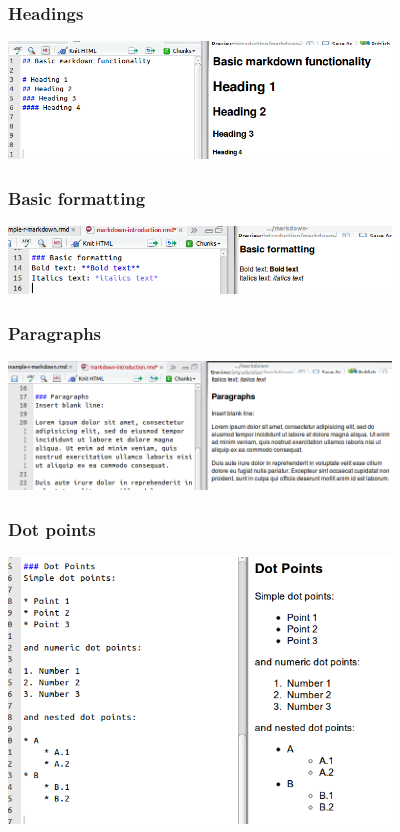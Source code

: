 \begin{frame}\frametitle{Headings}

\includegraphics[width=4in]{figures/headings.png}

\end{frame}

\begin{frame}\frametitle{Basic formatting}

\includegraphics[width=4in]{figures/basic-formatting.png}

\end{frame}

\begin{frame}\frametitle{Paragraphs}

\includegraphics[width=4in]{figures/paragraphs.png}

\end{frame}

\begin{frame}\frametitle{Dot points}

\includegraphics[width=4in]{figures/dot-points.png}

\end{frame}

